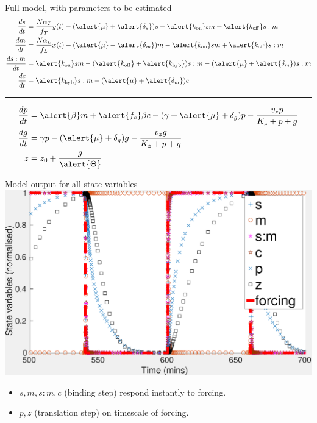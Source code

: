 \documentclass{beamer}
\begin{document}
\small
\begin{frame}{Full model, with parameters to be estimated}
\begin{align*} 
\frac{ds}{dt} &= \frac{N\alpha_{T}}{f_{T}} y(t)-(\alert{\mu} + \alert{\delta_{s}})s -\alert{k_{\mathrm{on}}}sm +\alert{k_{\mathrm{off}}}s:m \\
\frac{dm}{dt} &=  \frac{N\alpha_{L}}{f_{L}}x(t)-(\alert{\mu} + \alert{\delta_{m}})m -\alert{k_{\mathrm{on}}}sm +\alert{k_{\mathrm{off}}}s:m  \\
\frac{ds:m}{dt} & = \alert{k_{\mathrm{on}}}sm  - (\alert{k_{\mathrm{off}}}+ \alert{k_{\mathrm{hyb}}})s:m  -(\alert{\mu} + \alert{\delta_{m}} )s:m \\
\frac{dc}{dt} & = \alert{k_{\mathrm{hyb}}}s:m  -(\alert{\mu} + \alert{\delta_{m}})c  
\end{align*}
\begin{center}
\rule{0.5\textwidth}{.4pt}
\end{center}
\begin{align*}
\frac{dp}{dt} & = \alert{\beta} m +\alert{f_{s}}\beta c -(\gamma + \alert{\mu} + \delta_{g})p - \frac{v_{z}p}{K_{z}+p+g}   \\
\frac{dg}{dt} & = \gamma p - (\alert{\mu} + \delta_{g})g - \frac{v_{z}g}{K_{z}+p+g} \\
z &= z_{0} +\frac{g}{\alert{\Theta}} 
\end{align*}
\end{frame}
\normalsize


\begin{frame}{Model output for all state variables}
  \includegraphics[scale = 0.26, clip = true, trim = 0 0 0 0]{Figures/model_output}
  \begin{itemize}
    \item $s,m,s:m,c$ \alert{(binding step)} respond instantly to forcing.
    \item $p, z$ \alert{(translation step)} on timescale of forcing.
\end{itemize}
\end{frame}
\end{document}

